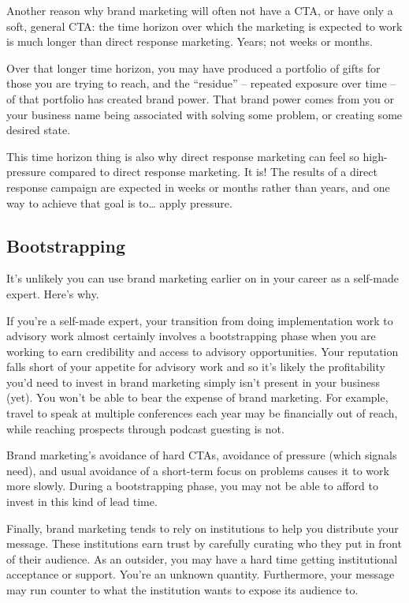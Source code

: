\documentclass[13pt,]{tufte-handout}
\begin{document}
Another reason why brand marketing will often not have a CTA, or have
only a soft, general CTA: the time horizon over which the marketing is
expected to work is much longer than direct response marketing. Years;
not weeks or months.

Over that longer time horizon, you may have produced a portfolio of
gifts for those you are trying to reach, and the ``residue'' -- repeated
exposure over time -- of that portfolio has created brand power. That
brand power comes from you or your business name being associated with
solving some problem, or creating some desired state.

This time horizon thing is also why direct response marketing can feel
so high-pressure compared to direct response marketing. It is! The
results of a direct response campaign are expected in weeks or months
rather than years, and one way to achieve that goal is to\ldots{} apply
pressure.

\hypertarget{bootstrapping}{%
\subsection{Bootstrapping}\label{bootstrapping}}

It's unlikely you can use brand marketing earlier on in your career as a
self-made expert. Here's why.

If you're a self-made expert, your transition from doing implementation
work to advisory work almost certainly involves a bootstrapping phase
when you are working to earn credibility and access to advisory
opportunities. Your reputation falls short of your appetite for advisory
work and so it's likely the profitability you'd need to invest in brand
marketing simply isn't present in your business (yet). You won't be able
to bear the expense of brand marketing. For example, travel to speak at
multiple conferences each year may be financially out of reach, while
reaching prospects through podcast guesting is not.

Brand marketing's avoidance of hard CTAs, avoidance of pressure (which
signals need), and usual avoidance of a short-term focus on problems
causes it to work more slowly. During a bootstrapping phase, you may not
be able to afford to invest in this kind of lead time.

Finally, brand marketing tends to rely on institutions to help you
distribute your message. These institutions earn trust by carefully
curating who they put in front of their audience. As an outsider, you
may have a hard time getting institutional acceptance or support. You're
an unknown quantity. Furthermore, your message may run counter to what
the institution wants to expose its audience to.
\end{document}
